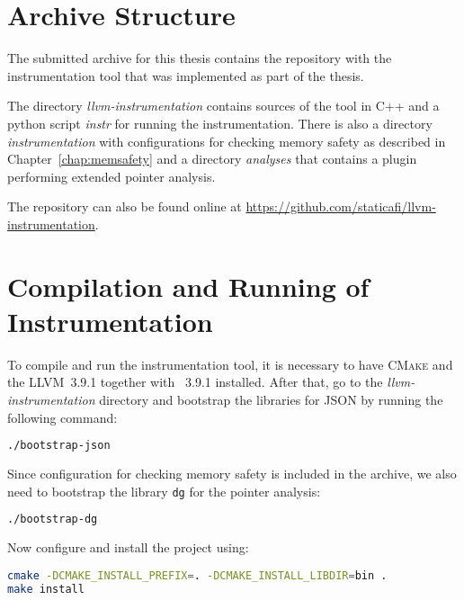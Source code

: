 
\section{Archive Structure}

The submitted archive for this thesis contains the repository with the
instrumentation tool that was implemented as part of the thesis.

The directory \emph{llvm-instrumentation} contains sources of the tool in C++
and a python script \emph{instr} for running the instrumentation. There is also
a directory \emph{instrumentation} with configurations for checking memory
safety as described in Chapter~\ref{chap:memsafety} and a directory
\emph{analyses} that contains a plugin performing extended pointer analysis.

The repository can also be found online at \url{https://github.com/staticafi/llvm-instrumentation}.

\section{Compilation and Running of Instrumentation}

To compile and run the instrumentation tool, it is necessary to have
\textsc{CMake} and the LLVM~3.9.1 together with \clang~3.9.1 installed. After
that, go to the \emph{llvm-instrumentation} directory and bootstrap the
libraries for JSON by running the following command:

\begin{lstlisting}[language=bash]
./bootstrap-json
\end{lstlisting}

\noindent Since configuration for checking memory safety is included in the archive, we
also need to bootstrap the library \texttt{dg} for the pointer analysis:

\begin{lstlisting}[language=bash]
./bootstrap-dg
\end{lstlisting}

\noindent Now configure and install the project using:

\begin{lstlisting}[language=bash]
cmake -DCMAKE_INSTALL_PREFIX=. -DCMAKE_INSTALL_LIBDIR=bin .
make install
\end{lstlisting}

